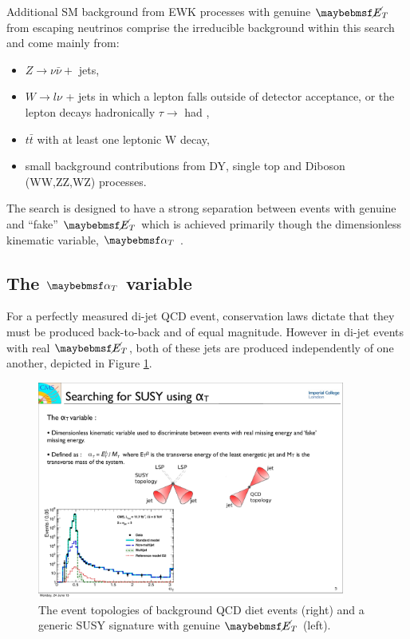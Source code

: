 Additional \ac{SM} background from \ac{EWK} processes with genuine $\met$ from escaping neutrinos comprise the irreducible background within this search and come mainly from:

\begin{itemize}
\item $Z \rightarrow \nu\bar{\nu} +$ jets,
\item $W \rightarrow l\nu$ + jets in which a lepton falls outside of detector acceptance, or the lepton decays hadronically $\tau \rightarrow$ had ,
\item $t\bar{t}$ with at least one leptonic W decay,
\item small background contributions from DY, single top and Diboson (WW,ZZ,WZ) processes.
\end{itemize}

The search is designed to have a strong separation between events with genuine and ``fake'' $\met$ which is achieved primarily though the dimensionless kinematic variable, $\alphat$ \cite{PhysRevLett.101.221803}\cite{CMS:2008vya}.

\subsection{The $\alphat$ variable}
\label{subsec:alphatvariable}

For a perfectly measured di-jet QCD event, conservation laws dictate that they must be produced back-to-back and of equal magnitude. However in di-jet events with real $\met$, both of these jets are produced independently of one another, depicted in Figure \ref{fig:susytopology}.
\begin{figure}[!h]
\centering
\includegraphics[width=0.90\textwidth]{plots/susy_topology.pdf}
\caption[The event topologies of background QCD diet events (right) and a generic \ac{SUSY} signature with genuine $\met$ (left).]{The event topologies of background QCD diet events (right) and a generic \ac{SUSY} signature with genuine $\met$ (left).}  
\label{fig:susytopology}
\end{figure}


